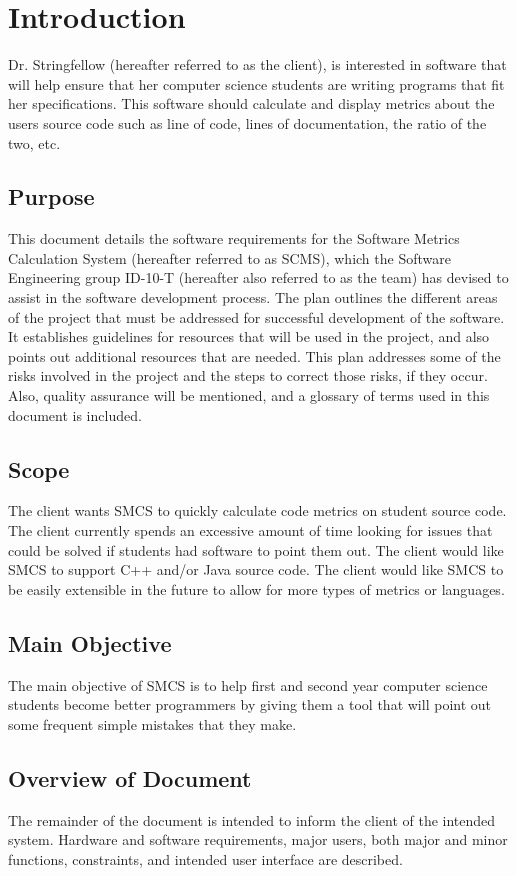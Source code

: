 \documentclass{scrreprt}
\begin{document}
	\chapter{Introduction}
	Dr. Stringfellow (hereafter referred to as the client), is interested in software that will help ensure that her computer science students are writing programs that fit her specifications. This software should calculate and display metrics about the users source code such as line of code, lines of documentation, the ratio of the two, etc.
	\section{Purpose}
	This document details the software requirements for the Software Metrics Calculation System (hereafter referred to as SCMS), which the Software Engineering group ID-10-T (hereafter also referred to as the team) has devised to assist in the software development process. The plan outlines the different areas of the project that must be addressed for successful development of the software. It establishes guidelines for resources that will be used in the project, and also points out additional resources that are needed. This plan addresses some of the risks involved in the project and the steps to correct those risks, if they occur. Also, quality assurance will be mentioned, and a glossary of terms used in this document is included.
	\section{Scope}
	The client wants SMCS to quickly calculate code metrics on student source code. The client currently spends an excessive amount of time looking for issues that could be solved if students had software to point them out. The client would like SMCS to support C++ and/or Java source code. The client would like SMCS to be easily extensible in the future to allow for more types of metrics or languages.
	\section{Main Objective}
	The main objective of SMCS is to help first and second year computer science students become better programmers by giving them a tool that will point out some frequent simple mistakes that they make.
	\section{Overview of Document}
	The remainder of the document is intended to inform the client of the intended system. Hardware and software requirements, major users, both major and minor functions, constraints, and intended user interface are described.
\end{document}
